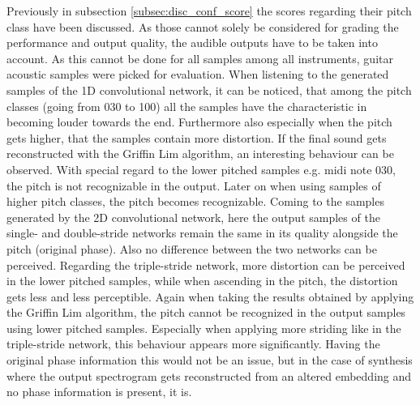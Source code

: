 Previously in subsection \ref{subsec:disc_conf_score} the scores regarding their pitch class have been discussed. As those cannot solely be considered for grading the performance and output quality, the audible outputs have to be taken into account. As this cannot be done for all samples among all instruments, guitar acoustic samples were picked for evaluation. When listening to the generated samples of the 1D convolutional network, it can be noticed, that among the pitch classes (going from 030 to 100) all the samples have the characteristic in becoming louder towards the end. Furthermore also especially when the pitch gets higher, that the samples contain more distortion. If the final sound gets reconstructed with the Griffin Lim algorithm, an interesting behaviour can be observed. With special regard to the lower pitched samples e.g. midi note 030, the pitch is not recognizable in the output. Later on when using samples of higher pitch classes, the pitch becomes recognizable. 
Coming to the samples generated by the 2D convolutional network, here the output samples of the single- and double-stride networks remain the same in its quality alongside the pitch (original phase). Also no difference between the two networks can be perceived. Regarding the triple-stride network, more distortion can be perceived in the lower pitched samples, while when ascending in the pitch, the distortion gets less and less perceptible. Again when taking the results obtained by applying the Griffin Lim algorithm, the pitch cannot be recognized in the output samples using lower pitched samples. Especially when applying more striding like in the triple-stride network, this behaviour appears more significantly. Having the original phase information this would not be an issue, but in the case of synthesis where the output spectrogram gets reconstructed from an altered embedding and no phase information is present, it is. 

